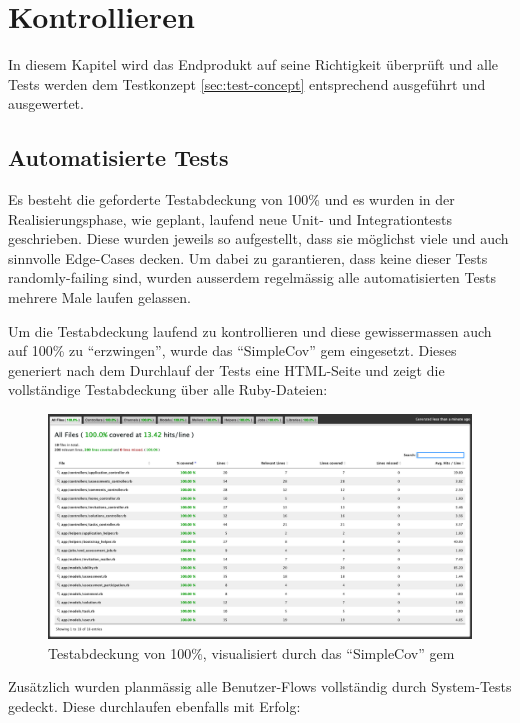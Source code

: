 \chapter{Kontrollieren}

In diesem Kapitel wird das Endprodukt auf seine Richtigkeit überprüft und alle
Tests werden dem Testkonzept \ref{sec:test-concept} entsprechend ausgeführt und ausgewertet.

\section{Automatisierte Tests}

Es besteht die geforderte Testabdeckung von 100\% und es wurden in der Realisierungsphase, wie geplant, laufend neue Unit- und Integrationtests geschrieben.
Diese wurden jeweils so aufgestellt, dass sie möglichst viele und auch sinnvolle Edge-Cases decken. Um dabei zu garantieren, dass keine dieser Tests randomly-failing sind,
wurden ausserdem regelmässig alle automatisierten Tests mehrere Male laufen gelassen.

Um die Testabdeckung laufend zu kontrollieren und diese gewissermassen auch auf 100\% zu \enquote{erzwingen}, wurde das \enquote{SimpleCov} gem eingesetzt.
Dieses generiert nach dem Durchlauf der Tests eine HTML-Seite und zeigt die vollständige Testabdeckung über alle Ruby-Dateien:

\begin{figure}[H]
  \centering
  \includegraphics[width=\textwidth]{images/test-coverage.png}
  \caption{\label{fig:test-coverage}Testabdeckung von 100\%, visualisiert durch das \enquote{SimpleCov} gem}
\end{figure}

Zusätzlich wurden planmässig alle Benutzer-Flows vollständig durch System-Tests gedeckt. Diese durchlaufen ebenfalls mit Erfolg:

